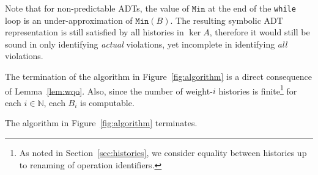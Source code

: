 \begin{remark}
Note that for non-predictable ADTs, the value of $\texttt{Min}$ at the end of the \texttt{while} loop 
is an under-approximation of $\texttt{Min}(B)$. 
The resulting symbolic ADT representation is still satisfied by all histories in $\ker A$, therefore it would still be sound in only identifying
\emph{actual} violations, yet incomplete in identifying \emph{all} violations.
\end{remark}

The termination of the algorithm in Figure~\ref{fig:algorithm} is a direct consequence of Lemma~\ref{lem:wqo}.
Also, since the number of weight-$i$ histories is finite\footnote{As
noted in Section~\ref{sec:histories}, we consider equality between histories up
to renaming of operation identifiers.} for each $i \in \mathbb{N}$, each $B_i$
is computable.


\begin{theorem}\label{th:corr2}
The algorithm in Figure~\ref{fig:algorithm} terminates.
\end{theorem}





